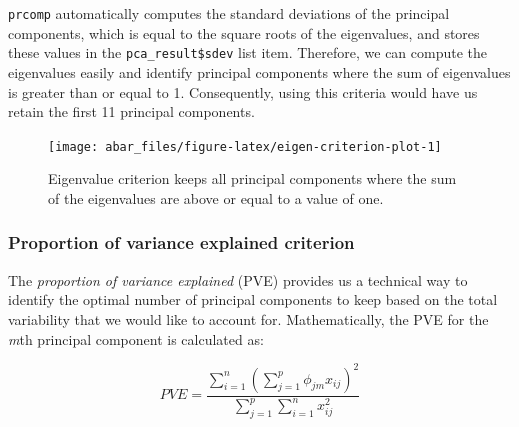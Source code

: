 \documentclass[]{book}
\newenvironment{Shaded}{\begin{snugshade}}{\end{snugshade}}
\newcommand{\CommentTok}[1]{\textcolor[rgb]{0.56,0.35,0.01}{\textit{#1}}}
\newcommand{\DecValTok}[1]{\textcolor[rgb]{0.00,0.00,0.81}{#1}}
\newcommand{\KeywordTok}[1]{\textcolor[rgb]{0.13,0.29,0.53}{\textbf{#1}}}
\newcommand{\NormalTok}[1]{#1}
\newcommand{\OperatorTok}[1]{\textcolor[rgb]{0.81,0.36,0.00}{\textbf{#1}}}
\newcommand{\StringTok}[1]{\textcolor[rgb]{0.31,0.60,0.02}{#1}}
\theoremstyle{definition}
\theoremstyle{definition}
\theoremstyle{definition}
\theoremstyle{remark}
\begin{document}
\texttt{prcomp} automatically computes the standard deviations of the
principal components, which is equal to the square roots of the
eigenvalues, and stores these values in the \texttt{pca\_result\$sdev}
list item. Therefore, we can compute the eigenvalues easily and identify
principal components where the sum of eigenvalues is greater than or
equal to 1. Consequently, using this criteria would have us retain the
first 11 principal components.

\begin{Shaded}
\end{Shaded}

\begin{figure}

{\centering \texttt{[image: abar\_files/figure-latex/eigen-criterion-plot-1]} 

}

\caption{Eigenvalue criterion keeps all principal components where the sum of the eigenvalues are above or equal to a value of one.}\label{fig:eigen-criterion-plot}
\end{figure}

\hypertarget{proportion-of-variance-explained-criterion}{%
\subsubsection{Proportion of variance explained
criterion}\label{proportion-of-variance-explained-criterion}}

The \emph{proportion of variance explained} (PVE) provides us a
technical way to identify the optimal number of principal components to
keep based on the total variability that we would like to account for.
Mathematically, the PVE for the \emph{m}th principal component is
calculated as:

\[PVE = \frac{{\sum_{i=1}^{n}(\sum_{j=1}^{p}{\phi_{jm}x_{ij}})^{2}}}{\sum_{j=1}^{p}\sum_{i=1}^{n}{x_{ij}^{2}}} \tag{3}\]
\end{document}
